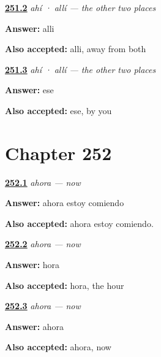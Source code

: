 \noindent\begin{minipage}[t]{\linewidth}
\raggedright
\hyperlink{review-ES-C65-ahi-alli-far}{\textbf{251.2}} \emph{ahí · allí — the other two places}\par
\small \textbf{Answer:} alli\par
\footnotesize \textbf{Also accepted:} alli, away from both
\end{minipage}\par\medskip

\noindent\begin{minipage}[t]{\linewidth}
\raggedright
\hyperlink{review-ES-C65-ahi-alli-pair}{\textbf{251.3}} \emph{ahí · allí — the other two places}\par
\small \textbf{Answer:} ese\par
\footnotesize \textbf{Also accepted:} ese, by you
\end{minipage}\par\medskip

\section*{Chapter 252}

\noindent\begin{minipage}[t]{\linewidth}
\raggedright
\hyperlink{review-ES-C65-ahora-hoy-now}{\textbf{252.1}} \emph{ahora — now}\par
\small \textbf{Answer:} ahora estoy comiendo\par
\footnotesize \textbf{Also accepted:} ahora estoy comiendo.
\end{minipage}\par\medskip

\noindent\begin{minipage}[t]{\linewidth}
\raggedright
\hyperlink{review-ES-C65-ahora-hoy-inside}{\textbf{252.2}} \emph{ahora — now}\par
\small \textbf{Answer:} hora\par
\footnotesize \textbf{Also accepted:} hora, the hour
\end{minipage}\par\medskip

\noindent\begin{minipage}[t]{\linewidth}
\raggedright
\hyperlink{review-ES-C65-ahora-hoy-vs}{\textbf{252.3}} \emph{ahora — now}\par
\small \textbf{Answer:} ahora\par
\footnotesize \textbf{Also accepted:} ahora, now
\end{minipage}\par\medskip

